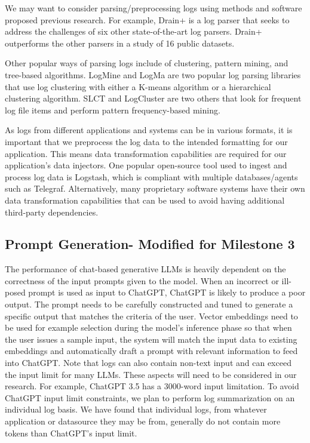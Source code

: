 \documentclass[conference]{IEEEtran}
\begin{document}
We may want to consider parsing/preprocessing logs using methods and software proposed previous research. For example, Drain+ \cite{10.1145/3540250.3558947} is a log parser that seeks to address the challenges of six other state-of-the-art log parsers. Drain+ outperforms the other parsers in a study of 16 public datasets.

Other popular ways of parsing logs include of clustering, pattern mining, and tree-based algorithms. LogMine and LogMa are two popular log parsing libraries that use log clustering with either a K-means algorithm or a hierarchical clustering algorithm. SLCT and LogCluster are two others that look for frequent log file items and perform pattern frequency-based mining. \cite{survey-log-aiops}

As logs from different applications and systems can be in various formats, it is important that we preprocess the log data to the intended formatting for our application. This means data transformation capabilities are required for our application's data injectors. One popular open-source tool used to ingest and process log data is Logstash, which is compliant with multiple databases/agents such as Telegraf. Alternatively, many proprietary software systems have their own data transformation capabilities that can be used to avoid having additional third-party dependencies. \cite{bendimerad2023onpremise}

\subsection{Prompt Generation- Modified for Milestone 3}

The performance of chat-based generative LLMs is heavily dependent on the correctness of the input prompts given to the model. When an incorrect or ill-posed prompt is used as input to ChatGPT, ChatGPT is likely to produce a poor output. The prompt needs to be carefully constructed and tuned to generate a specific output that matches the criteria of the user. Vector embeddings need to be used for example selection during the model's inference phase so that when the user issues a sample input, the system will match the input data to existing embeddings and automatically draft a prompt with relevant information to feed into ChatGPT. Note that logs can also contain non-text input and can exceed the input limit for many LLMs. These aspects will need to be considered in our research. For example, ChatGPT 3.5 has a 3000-word input limitation. \cite{zhoudb} To avoid ChatGPT input limit constraints, we plan to perform log summarization on an individual log basis. We have found that individual logs, from whatever application or datasource they may be from, generally do not contain more tokens than ChatGPT's input limit.
\end{document}
